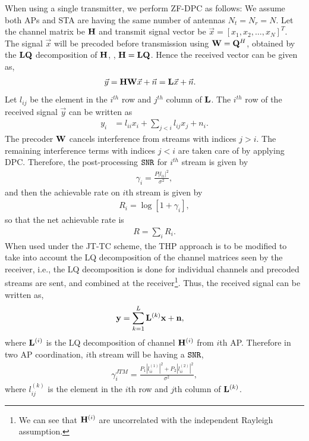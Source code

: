 When using a single transmitter, we perform ZF-DPC as  follows: 
We assume both APs and STA are having the same number of antennas $N_t=N_r=N$.
Let the channel matrix be $\mathbf{H}$ and transmit signal vector be $\Vec{x} = [x_1,x_2,\hdots, x_{N}]^T$. The signal $\Vec{x}$ will be precoded before transmission using $\mathbf{W} = \mathbf{Q}^H$, obtained by the $\mathbf{L} \mathbf{Q}$ decomposition of $\mathbf{H}$, \ie, $\mathbf{H}=\mathbf{L} \mathbf{Q}$. Hence the received vector can be given as,  
\begin{align}
    \Vec{y} &= \mathbf{H} \mathbf{W} \Vec{x}+ \Vec{n} = \mathbf{L} \Vec{x}+\Vec{n}.
    \label{eq:DF_DPC}
\end{align}
Let $l_{ij}$ be the element in the $i^{th}$ row and $j^{th}$ column of $\mathbf{L}$. The $i^{th}$ row of the received signal $\Vec{y}$ can be written as 
\begin{align*}
{y_i} &= {l_{ii} x_{i} + \sum_{j<i} l_{ij} x_j + n_i}.
\end{align*}
The precoder $\mathbf{W}$ cancels interference from streams with indices $j>i$. The remaining interference terms with indices $j<i$ are taken care of by applying DPC. Therefore, the post-processing $\mathtt{SNR}$ for $i^{th}$ stream is given by
\begin{align}\label{eq:sinr-downlink}
\gamma_{i}=\frac{P|l_{ii}|^2}{\sigma^2},
\end{align}
and then the achievable rate on $i$th stream is given by
\begin{align}\label{eqn:per_stream_rate}
R_i = \log [ 1+\gamma_i],
\end{align}
so that the net achievable rate is 
\begin{align}\label{eqn:net_rate_gen}
R = \sum_{i} R_i.
\end{align}
When used under the JT-TC scheme, the THP approach is to be modified to take into account the LQ decomposition of the channel matrices seen by the receiver, i.e., the LQ decomposition is done for individual channels and precoded streams are sent, and combined at the receiver\footnote{We can see that $\mathbf{H}^{(i)}$ are uncorrelated with the independent Rayleigh assumption.}. Thus, the received signal can be written as,
\begin{align}
\mathbf{y}&=\sum_{k=1}^{L}\mathbf{L}^{(k)}\mathbf{x}+\mathbf{n},
\label{eq:DF_DPC_adv}
\end{align}
where $\mathbf{L}^{(i)}$ is the LQ decomposition of channel $\mathbf{H}^{(i)}$ from $i$th AP.
Therefore in two AP coordination, $i$th stream will be having a $\mathtt{SNR}$,
\begin{align}\label{eqn:SNR_JT_MIMO}
\gamma^{JTM}_i=\frac{P_1 |l^{(1)}_{ii}|^2+P_2 |l^{(2)}_{ii}|^2}{\sigma^2},
\end{align} 
where $l^{(k)}_{ij}$ is the element in the $i$th row and $j$th column of $\mathbf{L}^{(k)}$. 


